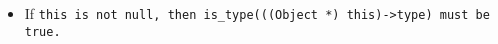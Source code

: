 \begin{itemize}

\item If \tt{this} is not null, then
\tt{is_type(((Object *) this)->type)} must be \tt{true}.

\end{itemize}
